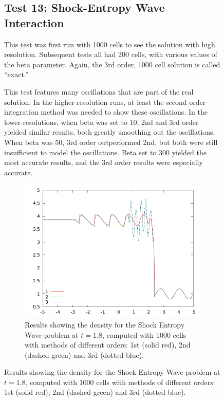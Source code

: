 \documentclass[10pt]{article}
\begin{document}
\begin{figure}[h]
\clearpage

\subsection{Test 13: Shock-Entropy Wave Interaction}

This test was first run with 1000 cells to see the solution with high resolution. Subsequent tests all had 200 cells, with various values of the beta parameter. Again, the 3rd order, 1000 cell solution is called ``exact.''

This test features many oscillations that are part of the real solution. In the higher-resolution runs, at least the second order integration method was needed to show these oscillations. In the lower-resolutions, when beta was set to 10, 2nd and 3rd order yielded similar results, both greatly smoothing out the oscillations. When beta was 50, 3rd order outperformed 2nd, but both were still insufficient to model the oscillations. Beta set to 300 yielded the most accurate results, and the 3rd order results were especially accurate. 

\begin{figure}[h]
  \begin{center}
     \includegraphics[width=.95\textwidth]{1000.png}	
  \end{center}
  \caption{Results showing the density for the Shock Entropy Wave problem at $t=1.8$, computed with 1000 cells with methods of different orders: 1st (solid red), 2nd (dashed green) and 3rd (dotted blue).}
  \label{fig:shock}
\end{figure}


\end{figure}
\end{document}
